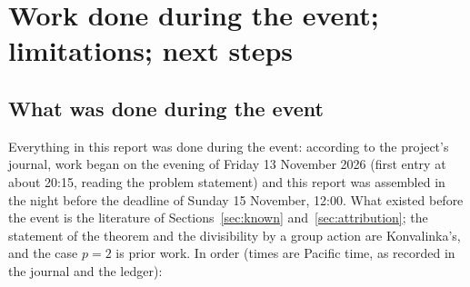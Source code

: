 \documentclass[11pt]{article}
\theoremstyle{definition}
\theoremstyle{remark}
\numberwithin{equation}{section}
\numberwithin{figure}{section}
\begin{document}
\section{Work done during the event; limitations; next steps}\label{sec:event}
\subsection{What was done during the event}
Everything in this report was done during the event: according to the project's journal, work began on the
evening of Friday 13 November 2026 (first entry at about 20:15, reading the problem statement) and this
report was assembled in the night before the deadline of Sunday 15 November, 12:00. What existed before the
event is the literature of Sections~\ref{sec:known} and~\ref{sec:attribution}; the statement of the theorem
and the divisibility by a group action are Konvalinka's, and the case $p=2$ is prior work. In order (times
are Pacific time, as recorded in the journal and the ledger):
\end{document}

